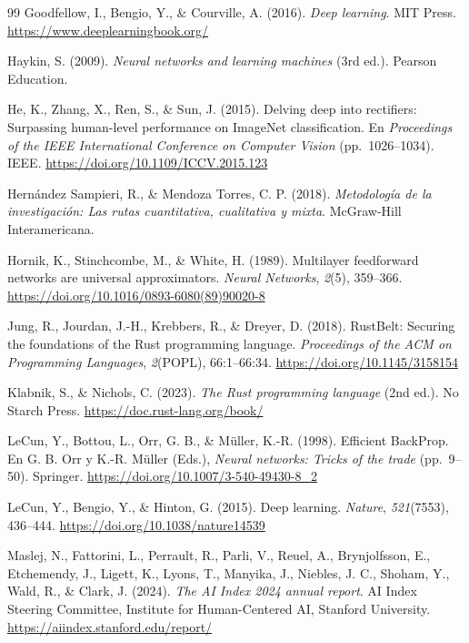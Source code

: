 \begin{thebibliography}{99}
Goodfellow, I., Bengio, Y., \& Courville, A. (2016). \emph{Deep learning}. MIT Press. \url{https://www.deeplearningbook.org/}

Haykin, S. (2009). \emph{Neural networks and learning machines} (3rd ed.). Pearson Education.

He, K., Zhang, X., Ren, S., \& Sun, J. (2015). Delving deep into rectifiers: Surpassing human-level performance on ImageNet classification. En \emph{Proceedings of the IEEE International Conference on Computer Vision} (pp.~1026–1034). IEEE. \url{https://doi.org/10.1109/ICCV.2015.123}

Hernández Sampieri, R., \& Mendoza Torres, C. P. (2018). \emph{Metodología de la investigación: Las rutas cuantitativa, cualitativa y mixta}. McGraw-Hill Interamericana.

Hornik, K., Stinchcombe, M., \& White, H. (1989). Multilayer feedforward networks are universal approximators. \emph{Neural Networks}, \emph{2}(5), 359–366. \url{https://doi.org/10.1016/0893-6080(89)90020-8}

Jung, R., Jourdan, J.-H., Krebbers, R., \& Dreyer, D. (2018). RustBelt: Securing the foundations of the Rust programming language. \emph{Proceedings of the ACM on Programming Languages}, \emph{2}(POPL), 66:1–66:34. \url{https://doi.org/10.1145/3158154}

Klabnik, S., \& Nichols, C. (2023). \emph{The Rust programming language} (2nd ed.). No Starch Press. \url{https://doc.rust-lang.org/book/}

LeCun, Y., Bottou, L., Orr, G. B., \& Müller, K.-R. (1998). Efficient BackProp. En G. B. Orr y K.-R. Müller (Eds.), \emph{Neural networks: Tricks of the trade} (pp.~9–50). Springer. \url{https://doi.org/10.1007/3-540-49430-8_2}

LeCun, Y., Bengio, Y., \& Hinton, G. (2015). Deep learning. \emph{Nature}, \emph{521}(7553), 436–444. \url{https://doi.org/10.1038/nature14539}

Maslej, N., Fattorini, L., Perrault, R., Parli, V., Reuel, A., Brynjolfsson, E., Etchemendy, J., Ligett, K., Lyons, T., Manyika, J., Niebles, J. C., Shoham, Y., Wald, R., \& Clark, J. (2024). \emph{The AI Index 2024 annual report}. AI Index Steering Committee, Institute for Human-Centered AI, Stanford University. \url{https://aiindex.stanford.edu/report/}


\end{thebibliography}
